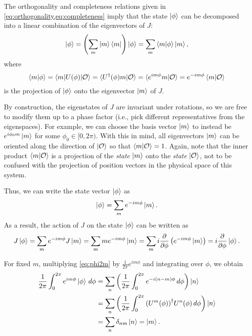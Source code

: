 The orthogonality and completeness relations given in \cref{eq:orthogonality,eq:completeness} imply that
the state $\ket{\phi}$ can be decomposed into a linear combination of the eigenvectors of $J$:
\begin{align*}
    \ket{\phi} = \left( \sum_{m} \ket{m}\bra{m} \right)\ket{\phi} = \sum_{m} \braket{m|\phi}\ket{m},
\end{align*}
where
\begin{align*}
    \braket{m|\phi} = \braket{m|U(\phi)|\mathcal{O}} = \braket{U^\dagger(\phi)m|\mathcal{O}} = \braket{e^{im\phi}m|\mathcal{O}} = e^{-im\phi}\braket{m|\mathcal{O}}
\end{align*}
is the projection of $\ket{\phi}$ onto the eigenvector $\ket{m}$ of $J$. 

By construction, the eigenstates of $J$ are invariant under rotations, so we are free to modify them up to a phase factor (i.e., pick  different representatives from the eigenspaces). For example, we can choose the basis vector $\ket{m}$ to instead be $e^{i\phi_0 m}\ket{m}$ for some $\phi_0\in[0,2\pi)$.  With this in mind, all eigenvectors $\ket{m}$ can be oriented along the direction of $\ket{\mathcal{O}}$ so that $\braket{m|\mathcal{O}} = 1$. Again, note that the inner product $\braket{m|\mathcal{O}}$ is a projection of the \textit{state} $\ket{m}$ onto the \textit{state} $\ket{\mathcal{O}}$, not to be confused with the projection of position vectors in the physical space of this system.

Thus, we can write the state vector $\ket{\phi}$ as
\begin{align}
    \ket{\phi} = \sum_{m} e^{-im\phi}\ket{m}.\label{eq:phi2m}
\end{align}
As a result, the action of $J$ on the state $\ket{\phi}$ can be written as
\begin{align*}
    J\ket{\phi} = \sum_{m} e^{-im\phi} J\ket{m} = \sum_{m} m e^{-im\phi}\ket{m} = \sum_{m} i \frac{\partial}{\partial\phi} \left( e^{-im\phi}\ket{m} \right) = i\frac{\partial}{\partial\phi}\ket{\phi}.
\end{align*}

For fixed $m$, multiplying \cref{eq:phi2m} by $\frac{1}{2\pi} e^{im\phi}$ and integrating over $\phi$, we obtain
\begin{align*}
    \frac{1}{2\pi}\int_{0}^{2\pi} e^{im\phi}\ket{\phi} \,d\phi 
        &= \sum_n \left( \frac{1}{2\pi}\int_{0}^{2\pi}e^{-i(n-m)\phi}\,d\phi \right)\ket{n} \\
        &= \sum_n \left( \frac{1}{2\pi}\int_{0}^{2\pi}{(U^m(\phi))}^\dagger U^n(\phi)\,d\phi \right)\ket{n} \\
        &= \sum_n \delta_{nm}\ket{n} = \ket{m}.
\end{align*}

